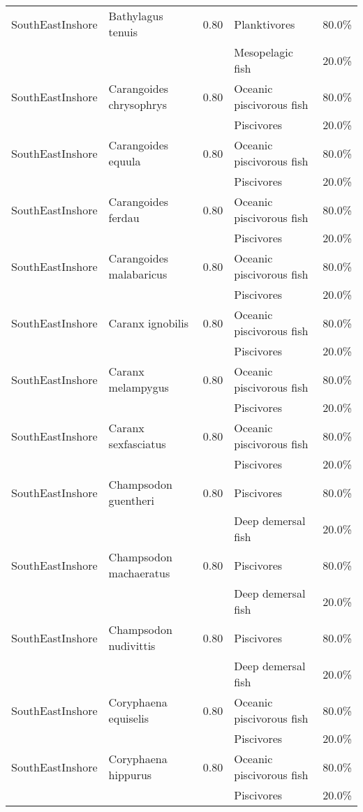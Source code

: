 \begin{longtable}{llcll}
\hline
SouthEastInshore & Bathylagus tenuis & 0.80 & Planktivores & 80.0\% \\
& & & Mesopelagic fish & 20.0\% \\
\hline
SouthEastInshore & Carangoides chrysophrys & 0.80 & Oceanic piscivorous fish & 80.0\% \\
& & & Piscivores & 20.0\% \\
\hline
SouthEastInshore & Carangoides equula & 0.80 & Oceanic piscivorous fish & 80.0\% \\
& & & Piscivores & 20.0\% \\
\hline
SouthEastInshore & Carangoides ferdau & 0.80 & Oceanic piscivorous fish & 80.0\% \\
& & & Piscivores & 20.0\% \\
\hline
SouthEastInshore & Carangoides malabaricus & 0.80 & Oceanic piscivorous fish & 80.0\% \\
& & & Piscivores & 20.0\% \\
\hline
SouthEastInshore & Caranx ignobilis & 0.80 & Oceanic piscivorous fish & 80.0\% \\
& & & Piscivores & 20.0\% \\
\hline
SouthEastInshore & Caranx melampygus & 0.80 & Oceanic piscivorous fish & 80.0\% \\
& & & Piscivores & 20.0\% \\
\hline
SouthEastInshore & Caranx sexfasciatus & 0.80 & Oceanic piscivorous fish & 80.0\% \\
& & & Piscivores & 20.0\% \\
\hline
SouthEastInshore & Champsodon guentheri & 0.80 & Piscivores & 80.0\% \\
& & & Deep demersal fish & 20.0\% \\
\hline
SouthEastInshore & Champsodon machaeratus & 0.80 & Piscivores & 80.0\% \\
& & & Deep demersal fish & 20.0\% \\
\hline
SouthEastInshore & Champsodon nudivittis & 0.80 & Piscivores & 80.0\% \\
& & & Deep demersal fish & 20.0\% \\
\hline
SouthEastInshore & Coryphaena equiselis & 0.80 & Oceanic piscivorous fish & 80.0\% \\
& & & Piscivores & 20.0\% \\
\hline
SouthEastInshore & Coryphaena hippurus & 0.80 & Oceanic piscivorous fish & 80.0\% \\
& & & Piscivores & 20.0\% \\
\hline

\end{longtable}
